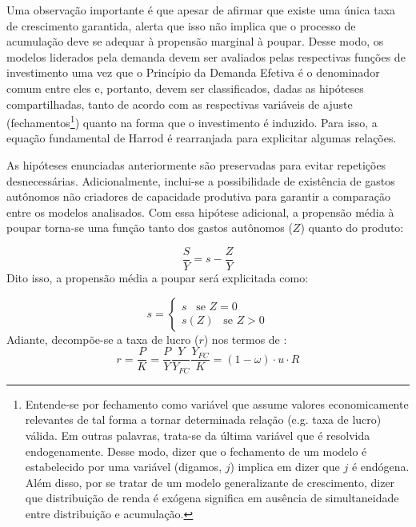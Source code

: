 Uma observação importante é que apesar de \textcite[p.~23]{harrod_essay_1939} afirmar que existe uma única taxa de crescimento garantida, \textcite{robinson_model_1962} alerta que isso não implica que o processo de acumulação %
deve se adequar à propensão marginal à poupar. Desse modo, os modelos liderados pela demanda devem ser avaliados pelas respectivas funções de investimento uma vez que o Princípio da Demanda Efetiva é o denominador comum entre eles e, portanto, devem ser classificados, dadas as hipóteses compartilhadas, tanto de acordo com as respectivas variáveis de ajuste (fechamentos\footnote{Entende-se por fechamento como variável que assume valores economicamente relevantes de tal forma a tornar determinada relação (e.g. taxa de lucro) válida. Em outras palavras, trata-se da última variável que é resolvida endogenamente. Desse modo, dizer que o fechamento de um modelo é estabelecido por uma variável (digamos, $j$) implica em dizer que $j$ é endógena. Além disso, por se tratar de um modelo generalizante de crescimento, dizer que distribuição de renda é exógena significa em ausência de simultaneidade entre distribuição e acumulação.}) quanto na forma que o investimento é induzido. Para isso, a equação fundamental de Harrod é rearranjada para explicitar algumas relações.


As hipóteses enunciadas anteriormente são preservadas para evitar repetições desnecessárias. Adicionalmente, inclui-se a possibilidade de existência de gastos autônomos não criadores de capacidade produtiva para garantir a comparação entre os modelos analisados. Com essa hipótese adicional, a propensão média à poupar torna-se uma função tanto dos gastos autônomos ($Z$) quanto do produto:

$$
    \frac{S}{Y} = s - \frac{Z}{Y}
$$
Dito isso, a propensão média a poupar será explicitada como:

\begin{equation}
  s = 
  \begin{cases}
  s \,\,\,\text{  se  } Z = 0\\
  s(Z) \,\,\,\text{  se  } Z > 0
  \end{cases}
  \end{equation}
  Adiante, decompõe-se a taxa de lucro ($r$) nos termos de \textcite{weisskopf_marxian_1979}:
  $$
  r = \frac{P}{K} = \frac{P}{Y}\frac{Y}{Y_{FC}}\frac{Y_{FC}}{K} = (1-\omega)\cdot u \cdot R
  $$
  
